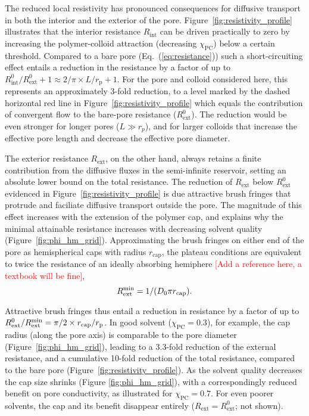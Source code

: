 \documentclass[12pt, a4paper]{article}
\newcommand\todo[1]{\textcolor{red}{#1}}
\begin{document}
The reduced local resistivity has pronounced consequences for diffusive transport in both the interior and the exterior of the pore.
Figure~\ref{fig:resistivity_profile} illustrates that the interior resistance $R_{\text{int}}$ can be driven practically to zero by increasing the polymer-colloid attraction (decreasing $\chi_\text{PC}$) below a certain threshold.
Compared to a bare pore (Eq.~(\ref{eq:resistance})) such a short-circuiting effect entails a reduction in the resistance by a factor of up to $R^0_{\text{int}}/R^0_{\text{ext}}+1 \approx 2/\pi \times L / r_{\text{p}} + 1$.
For the pore and colloid considered here, this represents an approximately 3-fold reduction, to a level marked by the dashed horizontal red line in Figure~\ref{fig:resistivity_profile} which equals the contribution of convergent flow to the bare-pore resistance ($R^0_\text{ext}$).
The reduction would be even stronger for longer pores ($L\gg r_p$), and for larger colloids that increase the effective pore length and decrease the effective pore diameter.

The exterior resistance $R_{\text{ext}}$, on the other hand, always retains a finite contribution from the diffusive fluxes in the semi-infinite reservoir, setting an absolute lower bound on the total resistance.
The reduction of $R_{\text{ext}}$ below $R^0_\text{ext}$ evidenced in Figure~\ref{fig:resistivity_profile} is due attractive brush fringes that protrude and faciliate diffusive transport outside the pore.
The magnitude of this effect increases with the extension of the polymer cap, and explains why the minimal attainable resistance increases with decreasing solvent quality (Figure~\ref{fig:phi_hm_grid}).
Approximating the brush fringes on either end of the pore as hemispherical caps with radius $r_\text{cap}$, the plateau conditions are equivalent to twice the resistance of an ideally absorbing hemiphere
\todo{[Add a reference here, a textbook will be fine]},
\begin{equation}
   R_\text{ext}^\text{\text{min}} = 1 / (D_0 \pi r_\text{cap}).
    \label{R_ext_min}
\end{equation}

Attractive brush fringes thus entail a reduction in resistance by a factor of up to $R_\text{ext}^0 / R_\text{ext}^\text{\text{min}} = \pi/2 \times r_\text{cap}/r_\text{p}$.
In good solvent ($\chi_\text{PC} = 0.3$), for example, the cap radius (along the pore axis) is comparable to the pore diameter (Figure~\ref{fig:phi_hm_grid}), leading to a 3.3-fold reduction of the external resistance, and a cumulative 10-fold reduction of the total resistance, compared to the bare pore (Figure~\ref{fig:resistivity_profile}).
As the solvent quality decreases the cap size shrinks (Figure \ref{fig:phi_hm_grid}), with a correspondingly reduced benefit on pore conductivity, as illustrated for $\chi_\text{PC} = 0.7$.
For even poorer solvents, the cap and its benefit disappear entirely ($R_\text{ext} = R_\text{ext}^0$; not shown).
\end{document}
